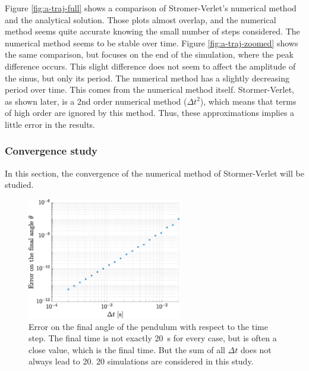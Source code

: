 \documentclass[a4paper,12pt,twoside]{article}
\begin{document}
Figure \ref{fig:a-traj-full} shows a comparison of Stromer-Verlet's numerical method and the analytical solution.
Those plots almost overlap, and the numerical method seems quite accurate knowing the small number of steps considered.
The numerical method seems to be stable over time.
Figure \ref{fig:a-traj-zoomed} shows the same comparison, but focuses on the end of the simulation, where the peak difference occurs.
This slight difference does not seem to affect the amplitude of the sinus, but only its period.
The numerical method has a slightly decreasing period over time.
This comes from the numerical method itself.
Stormer-Verlet, as shown later, is a 2nd order numerical method ($\Delta t^2$), which means that terms of high order are ignored by this method.
Thus, these approximations implies a little error in the results.


\subsubsection{Convergence study}
In this section, the convergence of the numerical method of Stormer-Verlet will be studied.

\begin{figure}[h]
\centering
	\includegraphics[width=0.6\textwidth]{graphs/a_conv.eps}
	\caption{Error on the final angle of the pendulum with respect to the time step. The final time is not exactly \SI{20}{\s} for every case, but is often a close value, which is the final time. But the sum of all $\Delta t$ does not always lead to \num{20}. \num{20} simulations are considered in this study.} %
	\label{fig:a-conv}
\end{figure}
\end{document}
